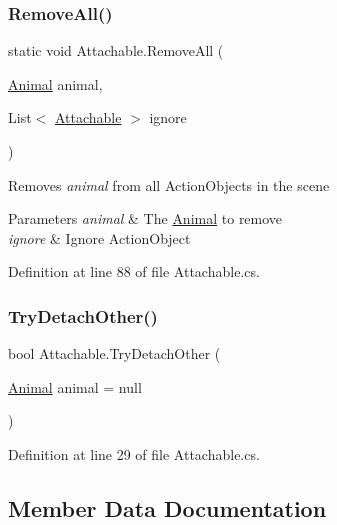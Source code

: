 \subsubsection{\texorpdfstring{Remove\+All()}{RemoveAll()}\hspace{0.1cm}{\footnotesize\ttfamily [3/3]}}
{\footnotesize\ttfamily static void Attachable.\+Remove\+All (\begin{DoxyParamCaption}\item[{\mbox{\hyperlink{class_animal}{Animal}}}]{animal,  }\item[{List$<$ \mbox{\hyperlink{class_attachable}{Attachable}} $>$}]{ignore }\end{DoxyParamCaption})\hspace{0.3cm}{\ttfamily [static]}}



Removes {\itshape animal}  from all Action\+Objects in the scene 


\begin{DoxyParams}{Parameters}
{\em animal} & The \mbox{\hyperlink{class_animal}{Animal}} to remove\\
\hline
{\em ignore} & Ignore Action\+Object\\
\hline
\end{DoxyParams}


Definition at line 88 of file Attachable.\+cs.

\mbox{\label{class_attachable_ad8e67a23808330a401d6cf95f30d4ead}} 
\subsubsection{\texorpdfstring{Try\+Detach\+Other()}{TryDetachOther()}}
{\footnotesize\ttfamily bool Attachable.\+Try\+Detach\+Other (\begin{DoxyParamCaption}\item[{\mbox{\hyperlink{class_animal}{Animal}}}]{animal = {\ttfamily null} }\end{DoxyParamCaption})}



Definition at line 29 of file Attachable.\+cs.



\subsection{Member Data Documentation}
\mbox{\label{class_attachable_a0a30ee7e7b2c59e52732ee993b0e5089}} 
